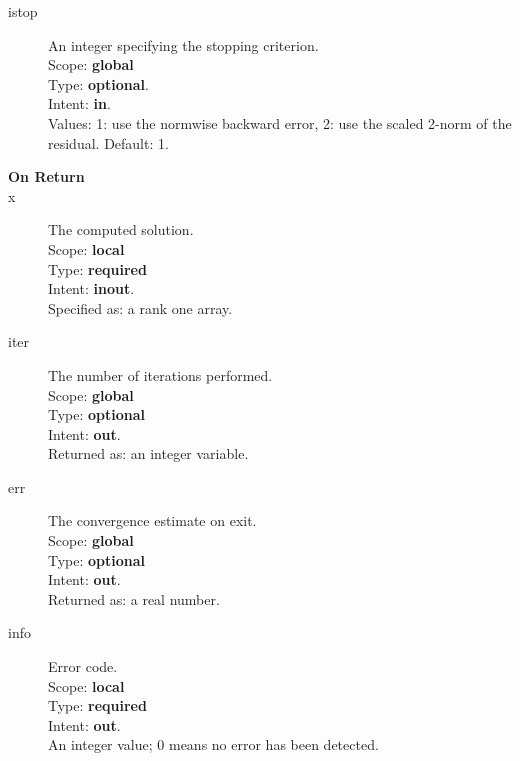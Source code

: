 \begin{description}
\item[istop]  An integer specifying the stopping criterion.\\
Scope: {\bf global} \\
Type: {\bf optional}.\\
Intent: {\bf in}.\\
Values: 1: use the normwise backward error, 2: use the scaled 2-norm
of the residual. Default: 1. 
\item[\bf On Return] 
\item[x] The computed solution. \\
Scope: {\bf local} \\
Type: {\bf required}\\
Intent: {\bf inout}.\\
Specified as: a rank one array.
\item[iter]  The number of iterations performed.\\
Scope: {\bf global} \\
Type: {\bf optional}\\
Intent: {\bf out}.\\
Returned  as: an integer variable.
\item[err]  The convergence estimate on exit.\\
Scope: {\bf global} \\
Type: {\bf optional}\\
Intent: {\bf out}.\\
Returned  as: a real number.
\item[info] Error code.\\
Scope: {\bf local} \\
Type: {\bf required} \\
Intent: {\bf out}.\\
An integer value; 0 means no error has been detected. 
\end{description}





